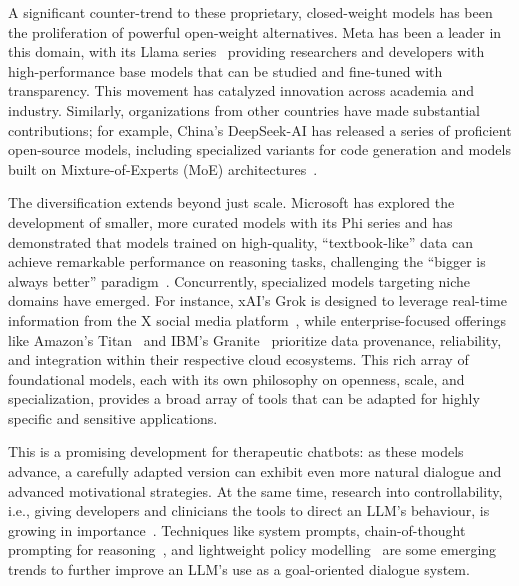 A significant counter-trend to these proprietary, closed-weight models has been the proliferation of powerful open-weight alternatives. Meta has been a leader in this domain, with its Llama series~\cite{touvron2023llama} providing researchers and developers with high-performance base models that can be studied and fine-tuned with transparency. This movement has catalyzed innovation across academia and industry. Similarly, organizations from other countries have made substantial contributions; for example, China's DeepSeek-AI has released a series of proficient open-source models, including specialized variants for code generation and models built on Mixture-of-Experts (MoE) architectures~\cite{deepseek2024deepseekv2}.

The diversification extends beyond just scale. Microsoft has explored the development of smaller, more curated models with its Phi series and has demonstrated that models trained on high-quality, ``textbook-like'' data can achieve remarkable performance on reasoning tasks, challenging the ``bigger is always better'' paradigm~\cite{li2023textbooks}. Concurrently, specialized models targeting niche domains have emerged. For instance, xAI's Grok is designed to leverage real-time information from the X social media platform~\cite{xai2023grok}, while enterprise-focused offerings like Amazon's Titan~\cite{aws2023titan} and IBM's Granite~\cite{ibm2023granite} prioritize data provenance, reliability, and integration within their respective cloud ecosystems. This rich array of foundational models, each with its  own philosophy on openness, scale, and specialization, provides a broad array of tools that can be adapted for highly specific and sensitive applications.

This is a promising development for therapeutic chatbots: as these models advance, a carefully adapted version can exhibit even more natural dialogue and advanced motivational strategies. At the same time, research into controllability, i.e., giving developers and clinicians the tools to direct an LLM's behaviour, is growing in importance~\cite{fernandez-etal-2025-lamia}. Techniques like system prompts, chain-of-thought prompting for reasoning~\cite{10.5555/3600270.3602070}, and lightweight policy modelling~\cite{du-etal-2024-rewarding} are some emerging trends to further improve an LLM's use as a goal-oriented dialogue system.



